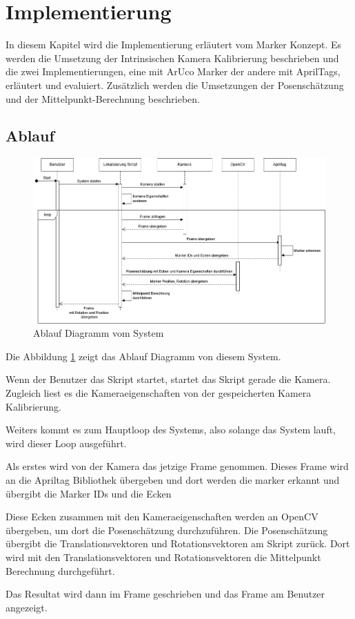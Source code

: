 \section{Implementierung}

In diesem Kapitel wird die Implementierung erläutert vom Marker Konzept. 
Es werden die Umsetzung der Intrinsischen Kamera Kalibrierung beschrieben und die zwei Implementierungen, eine mit ArUco Marker der andere mit AprilTags, erläutert und evaluiert.
Zusätzlich werden die Umsetzungen der Posenschätzung und der Mittelpunkt-Berechnung beschrieben.

\subsection{Ablauf}

\begin{figure}[H]
    \centering
    \includegraphics[width=0.5\linewidth]{graphics/Ablauf.png}
    \caption{Ablauf Diagramm vom System}
    \label{fig:Ablauf}
\end{figure}

Die Abbildung \ref{fig:Ablauf} zeigt das Ablauf Diagramm von diesem System. 

Wenn der Benutzer das Skript startet, startet das Skript gerade die Kamera.
Zugleich liest es die Kameraeigenschaften von der gespeicherten Kamera Kalibrierung.

Weiters kommt es zum Hauptloop des Systems, also solange das System lauft, wird dieser Loop ausgeführt.

Als erstes wird von der Kamera das jetzige Frame genommen. 
Dieses Frame wird an die Apriltag Bibliothek übergeben und dort werden die marker erkannt und übergibt die Marker IDs und die Ecken

Diese Ecken zusammen mit den Kameraeigenschaften werden an OpenCV übergeben, um dort die Posenschätzung durchzuführen.
Die Posenschätzung übergibt die Translationsvektoren und Rotationsvektoren am Skript zurück. 
Dort wird mit den Translationsvektoren und Rotationsvektoren die Mittelpunkt Berechnung durchgeführt.

Das Resultat wird dann im Frame geschrieben und das Frame am Benutzer angezeigt.

